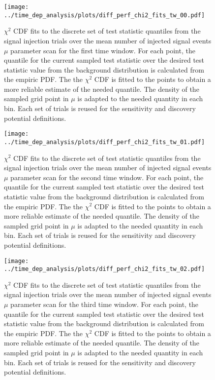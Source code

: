 \begin{figure}[H]
  \centering
  \texttt{[image: ../time\_dep\_analysis/plots/diff\_perf\_chi2\_fits\_tw\_00.pdf]}
  \caption[$\chi^2$ CDF fits for the 1st time window differential performance]{
     $\chi^2$ CDF fits to the discrete set of test statistic quantiles from the signal injection trials over the mean number of injected signal events $\mu$ parameter scan for the first time window.
     For each point, the quantile for the current sampled test statistic over the desired test statistic value from the background distribution is calculated from the empiric PDF.
     The the $\chi^2$ CDF is fitted to the points to obtain a more reliable estimate of the needed quantile.
     The density of the sampled grid point in $\mu$ is adapted to the needed quantity in each bin.
     Each set of trials is reused for the sensitivity and discovery potential definitions.
  }
  \label{fig:diff_perf_chi2_fits_tw_00}
\end{figure}
\begin{figure}[H]
  \centering
  \texttt{[image: ../time\_dep\_analysis/plots/diff\_perf\_chi2\_fits\_tw\_01.pdf]}
  \caption[$\chi^2$ CDF fits for the 2nd time window differential performance]{
     $\chi^2$ CDF fits to the discrete set of test statistic quantiles from the signal injection trials over the mean number of injected signal events $\mu$ parameter scan for the second time window.
     For each point, the quantile for the current sampled test statistic over the desired test statistic value from the background distribution is calculated from the empiric PDF.
     The the $\chi^2$ CDF is fitted to the points to obtain a more reliable estimate of the needed quantile.
     The density of the sampled grid point in $\mu$ is adapted to the needed quantity in each bin.
     Each set of trials is reused for the sensitivity and discovery potential definitions.
  }
  \label{fig:diff_perf_chi2_fits_tw_01}
\end{figure}
\begin{figure}[H]
  \centering
  \texttt{[image: ../time\_dep\_analysis/plots/diff\_perf\_chi2\_fits\_tw\_02.pdf]}
  \caption[$\chi^2$ CDF fits for the 3rd time window differential performance]{
     $\chi^2$ CDF fits to the discrete set of test statistic quantiles from the signal injection trials over the mean number of injected signal events $\mu$ parameter scan for the third time window.
     For each point, the quantile for the current sampled test statistic over the desired test statistic value from the background distribution is calculated from the empiric PDF.
     The the $\chi^2$ CDF is fitted to the points to obtain a more reliable estimate of the needed quantile.
     The density of the sampled grid point in $\mu$ is adapted to the needed quantity in each bin.
     Each set of trials is reused for the sensitivity and discovery potential definitions.
  }
  \label{fig:diff_perf_chi2_fits_tw_02}
\end{figure}
